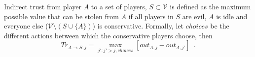 {}
\begin{definition}
  Indirect trust from player $A$ to a set of players, $S \subset \mathcal{V}$ is defined as the maximum possible value that
  can be stolen from $A$ if all players in $S$ are evil, $A$ is idle and everyone else ($\mathcal{V} \setminus \left(S \cup
  \{A\}\right)$) is conservative.  Formally, let $choices$ be the different actions between which the conservative players
  choose, then
  \begin{equation}
     Tr_{A \rightarrow S, j} = \max\limits_{j' : j' > j, choices}{\left[out_{A,j} - out_{A,j'}\right]} \enspace.
  \end{equation}
\end{definition}
